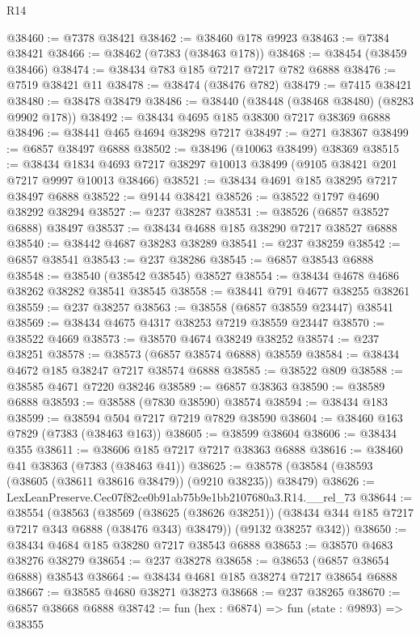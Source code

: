 \begin{lexlean}{R14}
\begin{coremodule}
@38460 := @7378 @38421
@38462 := @38460 @178 @9923
@38463 := @7384 @38421
@38466 := @38462 (@7383 (@38463 @178))
@38468 := @38454 (@38459 @38466)
@38474 := @38434 @783 @185 @7217 @7217 @782 @6888
@38476 := @7519 @38421 @11
@38478 := @38474 (@38476 @782)
@38479 := @7415 @38421
@38480 := @38478 @38479
@38486 := @38440 (@38448 (@38468 @38480) (@8283 @9902 @178))
@38492 := @38434 @4695 @185 @38300 @7217 @38369 @6888
@38496 := @38441 @465 @4694 @38298 @7217
@38497 := @271 @38367
@38499 := @6857 @38497 @6888
@38502 := @38496 (@10063 @38499) @38369
@38515 := @38434
    @1834
    @4693
    @7217
    @38297
    @10013
    @38499
    (@9105 @38421 @201 @7217 @9997 @10013 @38466)
@38521 := @38434 @4691 @185 @38295 @7217 @38497 @6888
@38522 := @9144 @38421
@38526 := @38522 @1797 @4690 @38292 @38294
@38527 := @237 @38287
@38531 := @38526 (@6857 @38527 @6888) @38497
@38537 := @38434 @4688 @185 @38290 @7217 @38527 @6888
@38540 := @38442 @4687 @38283 @38289
@38541 := @237 @38259
@38542 := @6857 @38541
@38543 := @237 @38286
@38545 := @6857 @38543 @6888
@38548 := @38540 (@38542 @38545) @38527
@38554 := @38434 @4678 @4686 @38262 @38282 @38541 @38545
@38558 := @38441 @791 @4677 @38255 @38261
@38559 := @237 @38257
@38563 := @38558 (@6857 @38559 @23447) @38541
@38569 := @38434 @4675 @4317 @38253 @7219 @38559 @23447
@38570 := @38522 @4669
@38573 := @38570 @4674 @38249 @38252
@38574 := @237 @38251
@38578 := @38573 (@6857 @38574 @6888) @38559
@38584 := @38434 @4672 @185 @38247 @7217 @38574 @6888
@38585 := @38522 @809
@38588 := @38585 @4671 @7220 @38246
@38589 := @6857 @38363
@38590 := @38589 @6888
@38593 := @38588 (@7830 @38590) @38574
@38594 := @38434 @183
@38599 := @38594 @504 @7217 @7219 @7829 @38590
@38604 := @38460 @163 @7829 (@7383 (@38463 @163))
@38605 := @38599 @38604
@38606 := @38434 @355
@38611 := @38606 @185 @7217 @7217 @38363 @6888
@38616 := @38460 @41 @38363 (@7383 (@38463 @41))
@38625 := @38578 (@38584 (@38593 (@38605 (@38611 @38616 @38479)) (@9210 @38235)) @38479)
@38626 := LexLeanPreserve.Cec07f82ce0b91ab75b9e1bb2107680a3.R14.__rel_73
@38644 := @38554
    (@38563
      (@38569
        (@38625 (@38626 @38251))
        (@38434 @344 @185 @7217 @7217 @343 @6888 (@38476 @343) @38479))
      (@9132 @38257 @342))
@38650 := @38434 @4684 @185 @38280 @7217 @38543 @6888
@38653 := @38570 @4683 @38276 @38279
@38654 := @237 @38278
@38658 := @38653 (@6857 @38654 @6888) @38543
@38664 := @38434 @4681 @185 @38274 @7217 @38654 @6888
@38667 := @38585 @4680 @38271 @38273
@38668 := @237 @38265
@38670 := @6857 @38668 @6888
@38742 := fun (hex : @6874) =>
  fun (state : @9893) =>
  @38355

\end{coremodule}
\end{lexlean}
